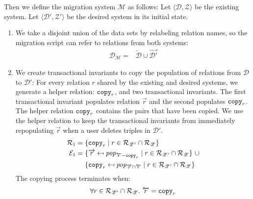 \documentclass[runningheads]{llncs}
\newcommand{\id}[1]{\text{\it #1\/}}
\newcommand{\popF}[1]{\id{pop}_{#1}}
\newcommand{\pair}[2]{\langle{#1},{#2}\rangle}
\newcommand{\rels}{\mathcal{R}}   %
\newcommand{\transactions}{\mathcal{E}}
\newcommand{\dataset}{\mathscr{D}}
\newcommand{\schema}{\mathscr{Z}}
\newcommand{\migrsys}{\mathscr{M}}
\begin{document}
   Then we define the migration system $\migrsys$ as follows:
   Let $\pair{\dataset}{\schema}$ be the existing system.
   Let $\pair{\dataset'}{\schema'}$ be the desired system in its initial state.
\begin{enumerate}
\item We take a disjoint union of the data sets by relabeling relation names, so the migration script can refer to relations from both systems:
   \begin{align}
      \dataset_\migrsys={}&\overleftarrow{\dataset}\cup\overrightarrow{\dataset'}
   \end{align}
\item\label{step2} We create transactional invariants to copy the population of relations from $\dataset$ to $\dataset'$:
   For every relation $r$ shared by the existing and desired systems, we generate a helper relation: ${\tt copy}_r$, and two transactional invariants.
   The first transactional invariant populates relation $\overrightarrow{r}$ and the second populates ${\tt copy}_r$.
   The helper relation ${\tt copy}_r$ contains the pairs that have been copied.
   We use the helper relation to keep the transactional invariants from immediately repopulating $\overrightarrow{r}$ when a user deletes triples in $\dataset'$.
   \begin{align}
      \rels_1={}&\{{\tt copy}_r\mid r\in\rels_{\schema'}\cap\rels_{\schema}\}\label{eqn:copy relations}\\
      \transactions_1={}&\{\overrightarrow{r}\mapsfrom \popF{\overleftarrow{r}-{\tt copy}_r} \mid r\in\rels_{\schema'}\cap\rels_{\schema}\}\ \cup\\
      {}&\{{\tt copy}_r\mapsfrom \popF{\overrightarrow{r}\cap\overleftarrow{r}} \mid r\in\rels_{\schema'}\cap\rels_{\schema}\}\notag
   \end{align}
   The copying process terminates when:
   \begin{align}
      \forall r\in\rels_{\schema'}\cap\rels_{\schema}.~\overleftarrow{r}={\tt copy}_r\label{eqn:copyingTerminates}
   \end{align}


\end{enumerate}
\end{document}
